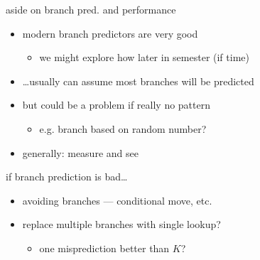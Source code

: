\begin{frame}{aside on branch pred. and performance}
    \begin{itemize}
    \item modern branch predictors are very good
        \begin{itemize}
        \item we might explore how later in semester (if time)
        \end{itemize}
    \item \ldots usually can assume most branches will be predicted
    \vspace{.5cm}
    \item but could be a problem if really no pattern
        \begin{itemize}
        \item e.g. branch based on random number?
        \end{itemize}
    \item generally: measure and see
    \end{itemize}
\end{frame}

\begin{frame}{if branch prediction is bad\ldots}
    \begin{itemize}
    \item avoiding branches --- conditional move, etc.
    \item replace multiple branches with single lookup?
        \begin{itemize}
        \item one misprediction better than $K$?
        \end{itemize}
    \end{itemize}
\end{frame}
